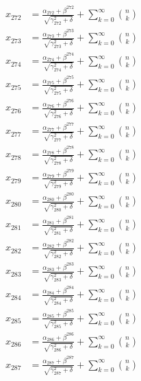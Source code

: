 \documentclass{article}
\begin{document}
\begin{align}
  x_{272} &= \frac{\alpha_{272} + \beta^{272}}{\sqrt{\gamma_{272}^2 + \delta}} + \sum_{k=0}^{\infty} \binom{n}{k} \label{eq:272} \\
  x_{273} &= \frac{\alpha_{273} + \beta^{273}}{\sqrt{\gamma_{273}^2 + \delta}} + \sum_{k=0}^{\infty} \binom{n}{k} \label{eq:273} \\
  x_{274} &= \frac{\alpha_{274} + \beta^{274}}{\sqrt{\gamma_{274}^2 + \delta}} + \sum_{k=0}^{\infty} \binom{n}{k} \label{eq:274} \\
  x_{275} &= \frac{\alpha_{275} + \beta^{275}}{\sqrt{\gamma_{275}^2 + \delta}} + \sum_{k=0}^{\infty} \binom{n}{k} \label{eq:275} \\
  x_{276} &= \frac{\alpha_{276} + \beta^{276}}{\sqrt{\gamma_{276}^2 + \delta}} + \sum_{k=0}^{\infty} \binom{n}{k} \label{eq:276} \\
  x_{277} &= \frac{\alpha_{277} + \beta^{277}}{\sqrt{\gamma_{277}^2 + \delta}} + \sum_{k=0}^{\infty} \binom{n}{k} \label{eq:277} \\
  x_{278} &= \frac{\alpha_{278} + \beta^{278}}{\sqrt{\gamma_{278}^2 + \delta}} + \sum_{k=0}^{\infty} \binom{n}{k} \label{eq:278} \\
  x_{279} &= \frac{\alpha_{279} + \beta^{279}}{\sqrt{\gamma_{279}^2 + \delta}} + \sum_{k=0}^{\infty} \binom{n}{k} \label{eq:279} \\
  x_{280} &= \frac{\alpha_{280} + \beta^{280}}{\sqrt{\gamma_{280}^2 + \delta}} + \sum_{k=0}^{\infty} \binom{n}{k} \label{eq:280} \\
  x_{281} &= \frac{\alpha_{281} + \beta^{281}}{\sqrt{\gamma_{281}^2 + \delta}} + \sum_{k=0}^{\infty} \binom{n}{k} \label{eq:281} \\
  x_{282} &= \frac{\alpha_{282} + \beta^{282}}{\sqrt{\gamma_{282}^2 + \delta}} + \sum_{k=0}^{\infty} \binom{n}{k} \label{eq:282} \\
  x_{283} &= \frac{\alpha_{283} + \beta^{283}}{\sqrt{\gamma_{283}^2 + \delta}} + \sum_{k=0}^{\infty} \binom{n}{k} \label{eq:283} \\
  x_{284} &= \frac{\alpha_{284} + \beta^{284}}{\sqrt{\gamma_{284}^2 + \delta}} + \sum_{k=0}^{\infty} \binom{n}{k} \label{eq:284} \\
  x_{285} &= \frac{\alpha_{285} + \beta^{285}}{\sqrt{\gamma_{285}^2 + \delta}} + \sum_{k=0}^{\infty} \binom{n}{k} \label{eq:285} \\
  x_{286} &= \frac{\alpha_{286} + \beta^{286}}{\sqrt{\gamma_{286}^2 + \delta}} + \sum_{k=0}^{\infty} \binom{n}{k} \label{eq:286} \\
  x_{287} &= \frac{\alpha_{287} + \beta^{287}}{\sqrt{\gamma_{287}^2 + \delta}} + \sum_{k=0}^{\infty} \binom{n}{k} \label{eq:287} \\

\end{align}
\end{document}
